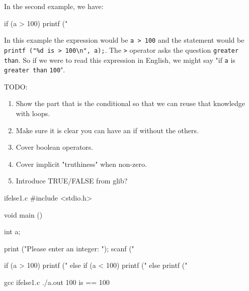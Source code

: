 In the second example, we have:

\begin{code}{}
if (a > 100) {
    printf ("%
}
\end{code}

In this example the expression would be \verb|a > 100| and the statement
would be \verb|printf ("%d is > 100\n", a);|. The \verb|>| operator asks
the question \verb|greater than|. So if we were to read this expression in
English, we might say "if \verb|a| is \verb|greater than| \verb|100|".

TODO:

\begin{enumerate}
\item Show the part that is the conditional so that we can reuse that
      knowledge with loops.
\item Make sure it is clear you can have an if without the others.
\item Cover boolean operators.
\item Cover implicit "truthiness" when non-zero.
\item Introduce TRUE/FALSE from glib?
\end{enumerate}

\begin{code}{ifelse1.c}
#include <stdio.h>

void main ()
{
    int a;

    print ("Please enter an integer:  ");
    scanf ("%

    if (a > 100) {
        printf ("%
    } else if (a < 100) {
        printf ("%
    } else {
        printf ("%
    }
}
\end{code}

\begin{Terminal}
gcc ifelse1.c
./a.out
100 is == 100
\end{Terminal}
